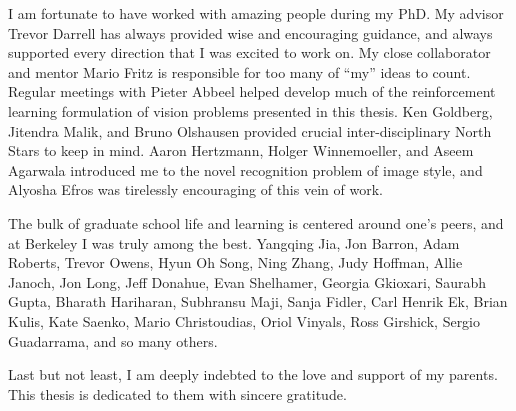 \begin{acknowledgements}
I am fortunate to have worked with amazing people during my PhD.
My advisor Trevor Darrell has always provided wise and encouraging guidance, and always supported every direction that I was excited to work on.
My close collaborator and mentor Mario Fritz is responsible for too many of ``my'' ideas to count.
Regular meetings with Pieter Abbeel helped develop much of the reinforcement learning formulation of vision problems presented in this thesis.
Ken Goldberg, Jitendra Malik, and Bruno Olshausen provided crucial inter-disciplinary North Stars to keep in mind.
Aaron Hertzmann, Holger Winnemoeller, and Aseem Agarwala introduced me to the novel recognition problem of image style, and Alyosha Efros was tirelessly encouraging of this vein of work.

The bulk of graduate school life and learning is centered around one's peers, and at Berkeley I was truly among the best.
Yangqing Jia, Jon Barron, Adam Roberts, Trevor Owens, Hyun Oh Song, Ning Zhang, Judy Hoffman, Allie Janoch, Jon Long, Jeff Donahue, Evan Shelhamer, Georgia Gkioxari, Saurabh Gupta, Bharath Hariharan, Subhransu Maji, Sanja Fidler, Carl Henrik Ek, Brian Kulis, Kate Saenko, Mario Christoudias, Oriol Vinyals, Ross Girshick, Sergio Guadarrama, and so many others.

Last but not least, I am deeply indebted to the love and support of my parents.
This thesis is dedicated to them with sincere gratitude.
\end{acknowledgements}
